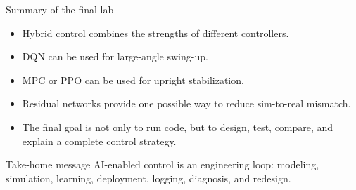 \documentclass[aspectratio=169]{beamer}
\begin{document}
\begin{frame}{Summary of the final lab}

\begin{itemize}
    \item Hybrid control combines the strengths of different controllers.
    \vspace{0.2cm}
    \item DQN can be used for large-angle swing-up.
    \vspace{0.2cm}
    \item MPC or PPO can be used for upright stabilization.
    \vspace{0.2cm}
    \item Residual networks provide one possible way to reduce sim-to-real mismatch.
    \vspace{0.2cm}
    \item The final goal is not only to run code, but to design, test, compare, and explain a complete control strategy.
\end{itemize}

\vspace{0.2cm}

\begin{alertblock}{Take-home message}
\small
AI-enabled control is an engineering loop:
modeling, simulation, learning, deployment, logging, diagnosis, and redesign.
\end{alertblock}

\end{frame}
\end{document}
